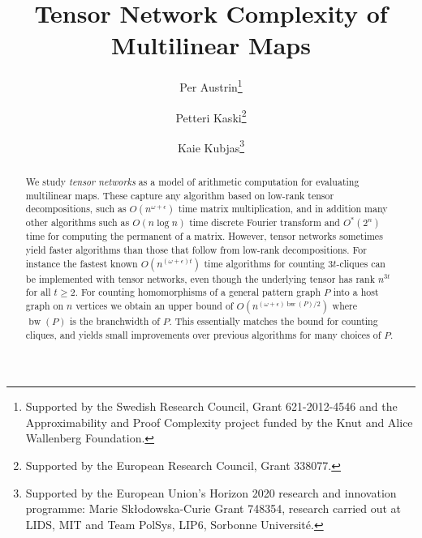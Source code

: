 \documentclass{toc}
\DeclareMathOperator{\bw}{bw}
\begin{document}
\begin{frontmatter} %

%
%

%
%

%
\title{Tensor Network Complexity of Multilinear Maps
    }

%
%
%
%
%
%
%
%
%
%
%
%


%
%
%
%

%

\author[austrin]{Per Austrin\thanks{Supported by the Swedish Research Council, Grant 621-2012-4546 and the Approximability and Proof Complexity project funded by the Knut and Alice Wallenberg Foundation.}}
\author[kaski]{Petteri Kaski\thanks{Supported by the European Research Council, Grant 338077.}}
\author[kubjas]{Kaie Kubjas\thanks{Supported by the European Union's Horizon 2020 research and innovation programme: Marie Sk\l{}odowska-Curie Grant 748354, research carried out at LIDS, MIT and Team PolSys, LIP6, Sorbonne Universit\'e.}}

%
%
%
%

%
%
%
%
%
%
\begin{abstract}
  We study \emph{tensor networks} as a model of arithmetic computation for
  evaluating multilinear maps.
  These capture any algorithm based on low-rank tensor decompositions, such as $O(n^{\omega+\epsilon})$ time matrix multiplication, and in addition many other algorithms such as $O(n \log n)$ time discrete Fourier transform and $O^*(2^n)$ time for computing the permanent of a matrix.
  However,  %
  tensor networks sometimes yield faster algorithms than those
  that follow from low-rank decompositions.  For instance the
  fastest known $O(n^{(\omega +\epsilon)t})$ time algorithms for
  counting $3t$-cliques can be implemented with tensor networks, even
  though the underlying tensor has rank $n^{3t}$ for all $t \ge 2$.
  For counting homomorphisms of a general pattern graph $P$ into a host graph on $n$ vertices we obtain an upper bound of $O(n^{(\omega+\epsilon)\bw(P)/2})$ where $\bw(P)$ is the branchwidth of $P$. This essentially matches the bound for counting cliques, and yields small improvements over previous algorithms for many choices of $P$.


\end{abstract}
\end{frontmatter}
\end{document}
